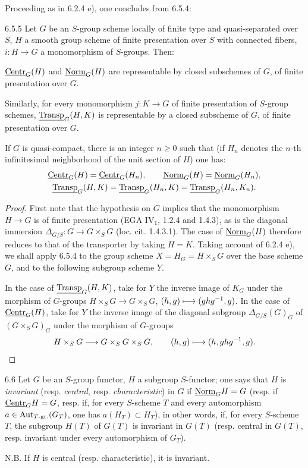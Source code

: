 Proceeding as in 6.2.4 e), one concludes from 6.5.4:
\begin{corollary}{6.5.5}\label{VIB.6.5.5}
Let $G$ be an $S$-group scheme locally of finite type and quasi-separated over $S$, $H$ a smooth group scheme of finite presentation over $S$ with connected fibers, $i:H\to G$ a monomorphism of $S$-groups. Then:
\begin{enumeratea}
\item $\underline{\mathrm{Centr}}_G(H)$ and $\underline{\mathrm{Norm}}_G(H)$ are representable by closed subschemes of $G$, of finite presentation over $G$.
\item[(a$'$)] Similarly, for every monomorphism $j:K\to G$ of finite presentation of $S$-group schemes, $\underline{\operatorname{Transp}}_G(H,K)$ is representable by a closed subscheme of $G$, of finite presentation over $G$.
\item[(b)] If $G$ is quasi-compact, there is an integer $n\ge0$ such that (if $H_n$ denotes the $n$-th infinitesimal neighborhood of the unit section of $H$) one has:
\[
\begin{gathered}
\underline{\mathrm{Centr}}_G(H)=\underline{\mathrm{Centr}}_G(H_n),\qquad\underline{\mathrm{Norm}}_G(H)=\underline{\mathrm{Norm}}_G(H_n),\\
\underline{\operatorname{Transp}}_G(H,K)=\underline{\operatorname{Transp}}_G(H_n,K)=\underline{\operatorname{Transp}}_G(H_n,K_n).
\end{gathered}
\]
\end{enumeratea}
\end{corollary}
\begin{proof}
First note that the hypothesis on $G$ implies that the monomorphism $H\to G$ is of finite presentation (EGA IV$_1$, 1.2.4 and 1.4.3), as is the diagonal immersion $\Delta_{G/S}:G\to G\times_SG$ (loc. cit. 1.4.3.1). The case of $\underline{\mathrm{Norm}}_G(H)$ therefore reduces to that of the transporter by taking $H=K$. Taking account of 6.2.4 e), we shall apply 6.5.4 to the group scheme $X=H_G=H\times_SG$ over the base scheme $G$, and to the following subgroup scheme $Y$.

In the case of $\underline{\operatorname{Transp}}_G(H,K)$, take for $Y$ the inverse image of $K_G$ under the morphism of $G$-groups $H\times_SG\to G\times_SG$, $(h,g)\longmapsto(ghg^{-1},g)$. In the case of $\underline{\mathrm{Centr}}_G(H)$, take for $Y$ the inverse image of the diagonal subgroup $\Delta_{G/S}(G)_G$ of $(G\times_SG)_G$ under the morphism of $G$-groups
\[
H\times_SG\longrightarrow G\times_SG\times_SG,\qquad(h,g)\longmapsto(h,ghg^{-1},g).
\]
\end{proof}
\begin{definition}{6.6}\label{VIB.6.6}
Let $G$ be an $S$-group functor, $H$ a subgroup $S$-functor; one says that $H$ is \emph{invariant} (resp. \emph{central}, resp. \emph{characteristic}) in $G$ if $\underline{\mathrm{Norm}}_GH=G$ (resp. if $\underline{\mathrm{Centr}}_GH=G$, resp. if, for every $S$-scheme $T$ and every automorphism $a\in\operatorname{Aut}_{T\text{-gr.}}(G_T)$, one has $a(H_T)\subset H_T$), in other words, if, for every $S$-scheme $T$, the subgroup $H(T)$ of $G(T)$ is invariant in $G(T)$ (resp. central in $G(T)$, resp. invariant under every automorphism of $G_T$).

N.B. If $H$ is central (resp. characteristic), it is invariant.
\end{definition}
